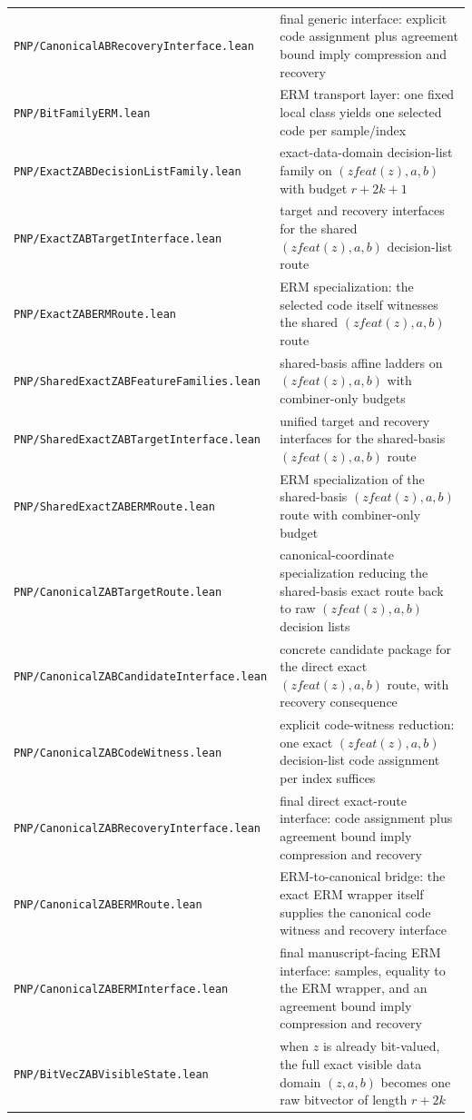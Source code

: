 \documentclass[11pt]{article}
\theoremstyle{remark}
\begin{document}
\begin{center}
\begin{tabular}{ll}
\texttt{PNP/CanonicalABRecoveryInterface.lean} & final generic interface: explicit code assignment plus agreement bound imply compression and recovery \\
\texttt{PNP/BitFamilyERM.lean} & ERM transport layer: one fixed local class yields one selected code per sample/index \\
\texttt{PNP/ExactZABDecisionListFamily.lean} & exact-data-domain decision-list family on $(zfeat(z),a,b)$ with budget $r+2k+1$ \\
\texttt{PNP/ExactZABTargetInterface.lean} & target and recovery interfaces for the shared $(zfeat(z),a,b)$ decision-list route \\
\texttt{PNP/ExactZABERMRoute.lean} & ERM specialization: the selected code itself witnesses the shared $(zfeat(z),a,b)$ route \\
\texttt{PNP/SharedExactZABFeatureFamilies.lean} & shared-basis affine ladders on $(zfeat(z),a,b)$ with combiner-only budgets \\
\texttt{PNP/SharedExactZABTargetInterface.lean} & unified target and recovery interfaces for the shared-basis $(zfeat(z),a,b)$ route \\
\texttt{PNP/SharedExactZABERMRoute.lean} & ERM specialization of the shared-basis $(zfeat(z),a,b)$ route with combiner-only budget \\
\texttt{PNP/CanonicalZABTargetRoute.lean} & canonical-coordinate specialization reducing the shared-basis exact route back to raw $(zfeat(z),a,b)$ decision lists \\
\texttt{PNP/CanonicalZABCandidateInterface.lean} & concrete candidate package for the direct exact $(zfeat(z),a,b)$ route, with recovery consequence \\
\texttt{PNP/CanonicalZABCodeWitness.lean} & explicit code-witness reduction: one exact $(zfeat(z),a,b)$ decision-list code assignment per index suffices \\
\texttt{PNP/CanonicalZABRecoveryInterface.lean} & final direct exact-route interface: code assignment plus agreement bound imply compression and recovery \\
\texttt{PNP/CanonicalZABERMRoute.lean} & ERM-to-canonical bridge: the exact ERM wrapper itself supplies the canonical code witness and recovery interface \\
\texttt{PNP/CanonicalZABERMInterface.lean} & final manuscript-facing ERM interface: samples, equality to the ERM wrapper, and an agreement bound imply compression and recovery \\
\texttt{PNP/BitVecZABVisibleState.lean} & when $z$ is already bit-valued, the full exact visible data domain $(z,a,b)$ becomes one raw bitvector of length $r+2k$ \\

\end{tabular}
\end{center}
\end{document}
